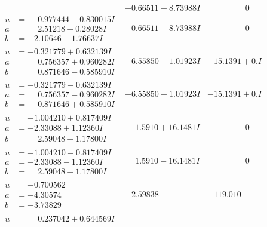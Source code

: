 \documentclass[1p]{elsarticle_modified}
\theoremstyle{definition}
\begin{document}
$$\begin{array}{c|c|c}
 & -0.66511 - 8.73988 I & \phantom{-0.000000 } 0 \\ \hline\begin{aligned}
u &= \phantom{-}0.977444 - 0.830015 I \\
a &= \phantom{-}2.51218 - 0.28028 I \\
b &= -2.10646 - 1.76637 I\end{aligned}
 & -0.66511 + 8.73988 I & \phantom{-0.000000 } 0 \\ \hline\begin{aligned}
u &= -0.321779 + 0.632139 I \\
a &= \phantom{-}0.756357 + 0.960282 I \\
b &= \phantom{-}0.871646 - 0.585910 I\end{aligned}
 & -6.55850 - 1.01923 I & -15.1391 + 0. I\phantom{ +0.000000I} \\ \hline\begin{aligned}
u &= -0.321779 - 0.632139 I \\
a &= \phantom{-}0.756357 - 0.960282 I \\
b &= \phantom{-}0.871646 + 0.585910 I\end{aligned}
 & -6.55850 + 1.01923 I & -15.1391 + 0. I\phantom{ +0.000000I} \\ \hline\begin{aligned}
u &= -1.004210 + 0.817409 I \\
a &= -2.33088 + 1.12360 I \\
b &= \phantom{-}2.59048 + 1.17800 I\end{aligned}
 & \phantom{-}1.5910 + 16.1481 I & \phantom{-0.000000 } 0 \\ \hline\begin{aligned}
u &= -1.004210 - 0.817409 I \\
a &= -2.33088 - 1.12360 I \\
b &= \phantom{-}2.59048 - 1.17800 I\end{aligned}
 & \phantom{-}1.5910 - 16.1481 I & \phantom{-0.000000 } 0 \\ \hline\begin{aligned}
u &= -0.700562\phantom{ +0.000000I} \\
a &= -4.30574\phantom{ +0.000000I} \\
b &= -3.73829\phantom{ +0.000000I}\end{aligned}
 & -2.59838\phantom{ +0.000000I} & -119.010\phantom{ +0.000000I} \\ \hline\begin{aligned}
u &= \phantom{-}0.237042 + 0.644569 I \\

\end{aligned}
\end{array}$$
\end{document}
